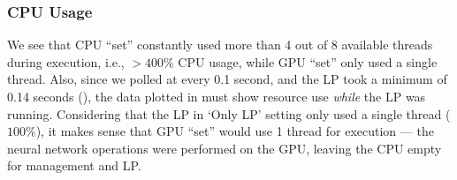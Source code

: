 \subsubsection{CPU Usage}
We see that CPU ``set'' constantly used more than 4 out of 8 available threads during execution, i.e., $>400\%$ CPU usage, while GPU ``set'' only used a single thread. Also, since we polled at every 0.1 second, and the LP took a minimum of 0.14 seconds (), the data plotted in  must show resource use \textit{while} the LP was running. Considering that the LP in `Only LP' setting only used a single thread ($100\%$), it makes sense that GPU ``set'' would use 1 thread for execution --- the neural network operations were performed on the GPU, leaving the CPU empty for management and LP. 

